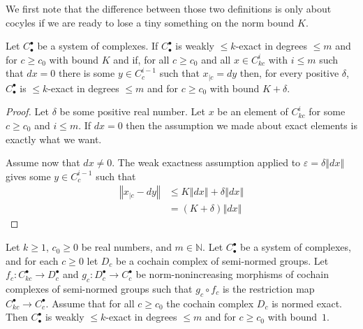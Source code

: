 We first note that the difference between those two definitions is only about
cocyles if we are ready to lose a tiny something on the norm bound $K$.

\begin{lemma}
  \label{is_bounded_exact_of_weakly}
  \leanok
  Let $C_\bullet^\bullet$ be a system of complexes. If $C_\bullet^\bullet$ is
  weakly $\leq k$-exact in degrees $\leq m$ and for $c\geq c_0$ with bound $K$ and if,
  for all $c\geq c_0$ and all $x\in C_{kc}^i$ with $i\leq m$ such that $dx = 0$
  there is some $y\in C_c^{i-1}$  such that
  $x_{|c} = dy$ then, for every positive $δ$,
  $C_\bullet^\bullet$ is $\leq k$-exact in degrees $\leq m$ and for $c\geq c_0$ with
  bound $K + δ$.
\end{lemma}

\begin{proof}
  \leanok
  Let $δ$ be some positive real number.
  Let $x$ be an element of $C_{kc}^i$ for some $c ≥ c_0$ and $i ≤ m$. If $dx = 0$
  then the assumption we made about exact elements is exactly what we want.

  Assume now that $dx ≠ 0$. The weak exactness assumption applied to $ε = δ‖dx‖$
  gives some $y\in C_c^{i-1}$ such that
  \begin{align*}
    ‖x_{|c} - dy‖ &≤ K‖dx‖ + δ‖dx‖ \\
                  &= (K + δ)‖dx‖
  \end{align*}
\end{proof}

\begin{lemma}
  \label{weak_exact_of_factor_exact}
  \leanok
  Let $k \ge 1$, $c_0 \ge 0$ be real numbers, and $m \in \mathbb N$.
  Let $C_\bullet^\bullet$ be a system of complexes,
  and for each $c \ge 0$ let $D_c$ be a cochain complex of semi-normed groups.
  Let $f_c \colon C^\bullet_{kc} \to D^\bullet_c$
  and $g_c \colon D^\bullet_c \to C^\bullet_c$ be
  norm-nonincreasing morphisms of cochain complexes of semi-normed groups
  such that $g_c \circ f_c$ is the restriction map $C^\bullet_{kc} \to C^\bullet_c$.
  Assume that for all $c \ge c_0$ the cochain complex $D_c$ is normed exact.
  Then $C_\bullet^\bullet$ is weakly $\le k$-exact in degrees $\le m$ and for $c \ge c_0$ with bound~$1$.
\end{lemma}

